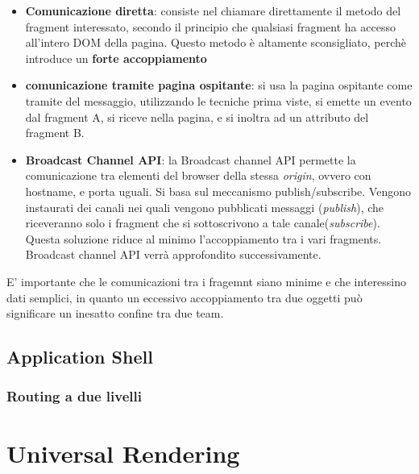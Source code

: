\begin{itemize}
    \item \textbf{Comunicazione diretta}: consiste nel chiamare direttamente il metodo del fragment
    interessato, secondo il principio che qualsiasi fragment ha accesso all'intero DOM della pagina.
    Questo metodo è altamente sconsigliato, perchè introduce un \textbf{forte accoppiamento}
    \item \textbf{comunicazione tramite pagina ospitante}: si usa la pagina ospitante come tramite del messaggio,
    utilizzando le tecniche prima viste, si emette un evento dal fragment A, si riceve nella pagina, e si inoltra ad un attributo 
    del fragment B.
    \item \textbf{Broadcast Channel API}: la Broadcast channel API permette la comunicazione 
    tra elementi del browser della stessa \emph{origin}, ovvero con hostname, e porta uguali. 
    Si basa sul meccanismo publish/subscribe.
    Vengono instaurati dei canali nei quali vengono pubblicati messaggi (\emph{publish}), 
    che riceveranno solo i fragment che si sottoscrivono a tale canale(\emph{subscribe}).
    Questa soluzione riduce al minimo l'accoppiamento tra i vari fragments.
    Broadcast channel API verrà approfondito successivamente.
\end{itemize}

E' importante che le comunicazioni tra i fragemnt siano minime e che interessino dati semplici, in quanto
un eccessivo accoppiamento tra due oggetti può significare un inesatto confine tra due team.


\subsection*{Application Shell}


\subsubsection*{Routing a due livelli}




\pagebreak
\section*{Universal Rendering}
